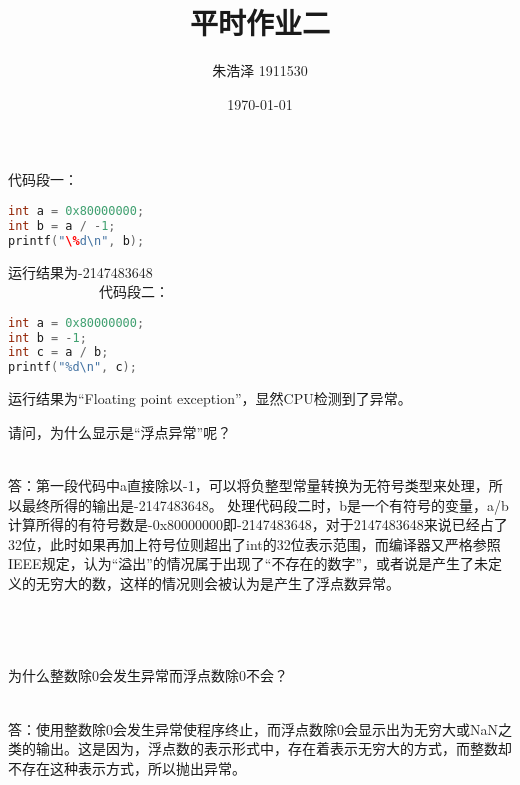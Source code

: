 \documentclass{homework}
\author{朱浩泽 1911530}
\date{\today}
\title{\Large{平时作业二}}
\begin{document}
 \maketitle

\question \large{代码段一：
\begin{lstlisting}[language = c++]
int a = 0x80000000;
int b = a / -1; 
printf("\%d\n", b);
\end{lstlisting}

运行结果为-2147483648
~\\

\ \ \ \ \ \ \ \ \ \ \ \ \ 代码段二：
\begin{lstlisting}[language = c++]
int a = 0x80000000;
int b = -1;
int c = a / b; 
printf("%d\n", c);
\end{lstlisting}

运行结果为“Floating point exception”，显然CPU检测到了异常。

请问，为什么显示是“浮点异常”呢？
}

~\\
答：第一段代码中a直接除以-1，可以将负整型常量转换为无符号类型来处理，所以最终所得的输出是-2147483648。
处理代码段二时，b是一个有符号的变量，a/b计算所得的有符号数是-0x80000000即-2147483648，对于2147483648来说已经占了32位，此时如果再加上符号位则超出了int的32位表示范围，而编译器又严格参照IEEE规定，认为“溢出”的情况属于出现了“不存在的数字”，或者说是产生了未定义的无穷大的数，这样的情况则会被认为是产生了浮点数异常。


~\\
~\\
~\\
\question \large{为什么整数除0会发生异常而浮点数除0不会？}


~\\
答：使用整数除0会发生异常使程序终止，而浮点数除0会显示出为无穷大或NaN之类的输出。这是因为，浮点数的表示形式中，存在着表示无穷大的方式，而整数却不存在这种表示方式，所以抛出异常。
\end{document}
